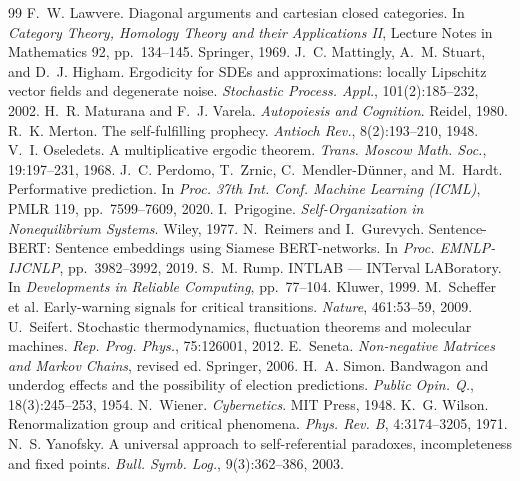 \documentclass[11pt]{article}
\theoremstyle{plain}
\theoremstyle{definition}
\theoremstyle{remark}
\begin{document}
\begin{thebibliography}{99}
 F.~W. Lawvere. Diagonal arguments and cartesian closed categories. In \emph{Category Theory, Homology Theory and their Applications II}, Lecture Notes in Mathematics 92, pp.~134--145. Springer, 1969.
 J.~C. Mattingly, A.~M. Stuart, and D.~J. Higham. Ergodicity for SDEs and approximations: locally Lipschitz vector fields and degenerate noise. \emph{Stochastic Process. Appl.}, 101(2):185--232, 2002.
 H.~R. Maturana and F.~J. Varela. \emph{Autopoiesis and Cognition}. Reidel, 1980.
 R.~K. Merton. The self-fulfilling prophecy. \emph{Antioch Rev.}, 8(2):193--210, 1948.
 V.~I. Oseledets. A multiplicative ergodic theorem. \emph{Trans. Moscow Math. Soc.}, 19:197--231, 1968.
 J.~C. Perdomo, T.~Zrnic, C.~Mendler-D\"unner, and M.~Hardt. Performative prediction. In \emph{Proc. 37th Int. Conf. Machine Learning (ICML)}, PMLR 119, pp.~7599--7609, 2020.
 I.~Prigogine. \emph{Self-Organization in Nonequilibrium Systems}. Wiley, 1977.
 N.~Reimers and I.~Gurevych. Sentence-BERT: Sentence embeddings using Siamese BERT-networks. In \emph{Proc. EMNLP-IJCNLP}, pp.~3982--3992, 2019.
 S.~M. Rump. INTLAB --- INTerval LABoratory. In \emph{Developments in Reliable Computing}, pp.~77--104. Kluwer, 1999.
 M.~Scheffer et al. Early-warning signals for critical transitions. \emph{Nature}, 461:53--59, 2009.
 U.~Seifert. Stochastic thermodynamics, fluctuation theorems and molecular machines. \emph{Rep. Prog. Phys.}, 75:126001, 2012.
 E.~Seneta. \emph{Non-negative Matrices and Markov Chains}, revised ed. Springer, 2006.
 H.~A. Simon. Bandwagon and underdog effects and the possibility of election predictions. \emph{Public Opin. Q.}, 18(3):245--253, 1954.
 N.~Wiener. \emph{Cybernetics}. MIT Press, 1948.
 K.~G. Wilson. Renormalization group and critical phenomena. \emph{Phys. Rev. B}, 4:3174--3205, 1971.
 N.~S. Yanofsky. A universal approach to self-referential paradoxes, incompleteness and fixed points. \emph{Bull. Symb. Log.}, 9(3):362--386, 2003.

\end{thebibliography}
\end{document}
